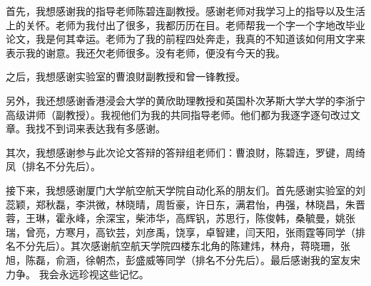 \begin{ack}

首先，我想感谢我的指导老师陈碧连副教授。感谢老师对我学习上的指导以及生活上的关怀。老师为我付出了很多，我都历历在目。老师帮我一个字一个字地改毕业论文，我是何其幸运。老师为了我的前程四处奔走，我真的不知道该如何用文字来表示我的谢意。我还欠老师很多。没有老师，便没有今天的我。

之后，我想感谢实验室的曹浪财副教授和曾一锋教授。

另外，我还想感谢香港浸会大学的黄欣助理教授和英国朴次茅斯大学大学的李浙宁高级讲师（副教授）。我视他们为我的共同指导老师。他们都为我逐字逐句改过文章。我找不到词来表达我有多感谢。

其次，我想感谢参与此次论文答辩的答辩组老师们：曹浪财，陈碧连，罗键，周绮凤（排名不分先后）。

接下来，我想感谢厦门大学航空航天学院自动化系的朋友们。首先感谢实验室的刘蕊颖，郑秋磊，李洪微，林晓晴，周哲豪，许日东，满君怡，冉强，林晓昌，朱晋蓉，王琳，霍永峰，余深宝，柴沛华，高辉钒，苏思行，陈俊韩，桑毓曼，姚张瑞，曾亮，方寒月，高钦芸，刘彦禹，饶享，卓智建，闫天阳，张雨霆等同学（排名不分先后）。其次感谢航空航天学院四楼东北角的陈建炜，林舟，蒋晓珊，张旭，陈磊，俞涵，徐朝杰，彭盛威等同学（排名不分先后）。最后感谢我的室友宋力争。
我会永远珍视这些记忆。


\end{ack}
